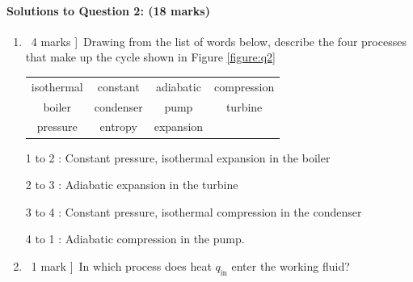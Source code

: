 \documentclass[a4paper,12pt,fleqn]{article}
\begin{document}
\paragraph{\textbf{Solutions to Question 2: (18 marks)}}
\begin{enumerate}[label=\alph*)]
\item \lbrack\ 4 marks ]\ Drawing from the list of words below, describe the four processes that make up the cycle shown in Figure \ref{figure:q2}\par
\begin{table}[h]
\centering
\begin{tabular}{c c c c}
isothermal & constant & adiabatic & compression\\
boiler & condenser & pump & turbine \\ 
pressure & entropy & expansion&\\
\end{tabular}
\end{table}
\par
1 to 2 : Constant pressure, isothermal expansion in the boiler\par
2 to 3 : Adiabatic expansion in the turbine\par
3 to 4 : Constant pressure, isothermal compression in the condenser\par
4 to 1 : Adiabatic compression in the pump.\par
\item \lbrack\ 1 mark ]\ In which process does heat $q_\mathrm{in}$ enter the working fluid?\par


\end{enumerate}
\end{document}
